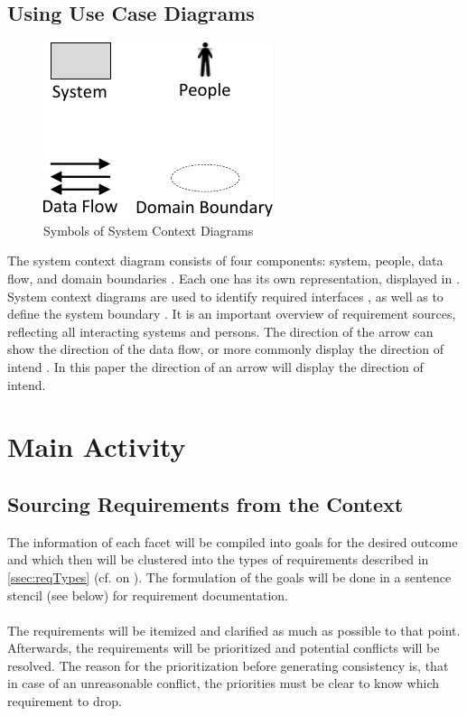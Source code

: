 \subsection{Using Use Case Diagrams}
\begin{figure}[H]
    \centering
    \includegraphics[scale=1]{img/SCDSymbols.pdf}
    \caption[Symbols of System Context Diagrams]{Symbols of System Context Diagrams \parencites[77]{Lauesen.2008}}
    \label{fig:scdSym}
\end{figure}
The system context diagram consists of four components: system, people, data flow, and domain boundaries \parencites[cf.][76-77]{Lauesen.2008}. Each one has its own representation, displayed in . System context diagrams are used to identify required interfaces \parencites[cf.][75]{Lauesen.2008}, as well as to define the system boundary \parencites[cf.][75]{Ebert.2014}. It is an important overview of requirement sources, reflecting all interacting systems and persons. The direction of the arrow can show the direction of the data flow, or more commonly display the direction of intend \parencite[cf.][77]{Lauesen.2008}. In this paper the direction of an arrow will display the direction of intend.


\section{Main Activity}
\subsection{Sourcing Requirements from the Context}
The information of each facet will be compiled into goals for the desired outcome and which then will be clustered into the types of requirements described in \cref{ssec:reqTypes} (cf.  on ). The formulation of the goals will be done in a sentence stencil (see below) for requirement documentation. 

\paragraph{} The requirements will be itemized and clarified as much as possible to that point. Afterwards, the requirements will be prioritized and potential conflicts will be resolved. The reason for the prioritization before generating consistency is, that in case of an unreasonable conflict, the priorities must be clear to know which requirement to drop.



